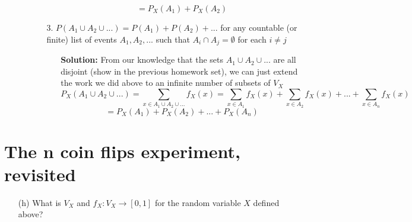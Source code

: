\documentclass[hidelinks]{article}
\begin{document}
\begin{itemize}
\begin{itemize}
\begin{itemize}
\begin{itemize}
                \[
                    = P_X(A_1) + P_X(A_2)
                \]
            \end{itemize}
            \item[3.] $P(A_1 \cup A_2 \cup ...) = P(A_1) + P(A_2) + ...$ for any countable (or finite) list of events $A_1, A_2, ...$ such that $A_i \cap A_j= \emptyset$ for each $i \neq j$
            \begin{itemize}
                \item[ ] \textbf{Solution: }From our knowledge that the sets $A_1 \cup A_2 \cup ...$ are all disjoint (show in the previous homework set), we can just extend the work we did above to an infinite number of subsets of $V_X$
                \[
                    P_X(A_1 \cup A_2 \cup ... ) =  \sum_{x \in A_1 \cup A_2 \cup ... } f_X(x) =  \sum_{x \in A_1} f_X(x) +  \sum_{x \in A_2} f_X(x) + ... + \sum_{x \in A_n} f_X(x) 
                \]
                \[
                    = P_X(A_1) + P_X(A_2) + ... +P_X(A_n)
                \]
            \end{itemize}
        \end{itemize}
    \end{itemize}
\end{itemize}
\newpage
\section{The n coin flips experiment, revisited}
    \begin{itemize}
    \item[(h)] What is $V_X$ and $f_X : V_X \rightarrow [0, 1]$ for the random variable $X$ defined above? 
    \end{itemize}
\end{document}

